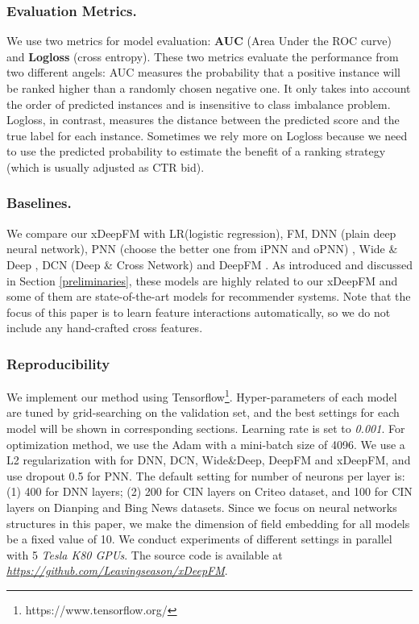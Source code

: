 \subsubsection{Evaluation Metrics.} We use two metrics for model evaluation: \textbf{AUC} (Area Under the ROC curve) and \textbf{Logloss} (cross entropy). These two metrics evaluate the performance from two different angels: AUC measures the probability that a positive instance will be ranked higher than a randomly chosen negative one. It only takes into account the order of predicted instances and is insensitive to class imbalance problem. Logloss, in contrast, measures the distance between the predicted score and the true label for each instance. Sometimes we rely more on Logloss because we need to use the predicted probability to estimate the benefit of a ranking strategy (which is usually adjusted as CTR  bid).
\subsubsection{Baselines.} We compare our xDeepFM with LR(logistic regression), FM, DNN (plain deep neural network), PNN (choose the better one from iPNN and oPNN) \cite{qu2016product}, Wide \& Deep \cite{cheng2016wide}, DCN (Deep \& Cross Network) \cite{wang2017deep} and DeepFM \cite{guo2017deepfm}. As introduced and discussed in Section \ref{preliminaries}, these models are highly related to our xDeepFM and some of them are state-of-the-art models for recommender systems. Note that the focus of this paper is to learn feature interactions automatically, so we do not include any hand-crafted cross features.  
\subsubsection{Reproducibility} We implement our method using Tensorflow\footnote{https://www.tensorflow.org/}. Hyper-parameters of each model are tuned by grid-searching on the validation set, and the best settings for each model will be shown in corresponding sections. Learning rate is set to \textsl{0.001}. For optimization method, we use the Adam \cite{kingma2014adam} with a mini-batch size of 4096. We use a L2 regularization with  for DNN, DCN, Wide\&Deep, DeepFM and xDeepFM, and use dropout 0.5 for PNN. The default setting for number of neurons per layer is: (1) 400 for DNN layers; (2) 200 for CIN layers on Criteo dataset, and 100 for CIN layers on Dianping and Bing News datasets. Since we focus on neural networks structures in this paper, we make the dimension of field embedding for all models be a fixed value of 10. We conduct experiments of different settings in parallel with 5 \textsl{Tesla K80 GPUs}.
The source code is available at \textsl{\url{https://github.com/Leavingseason/xDeepFM}}. 

